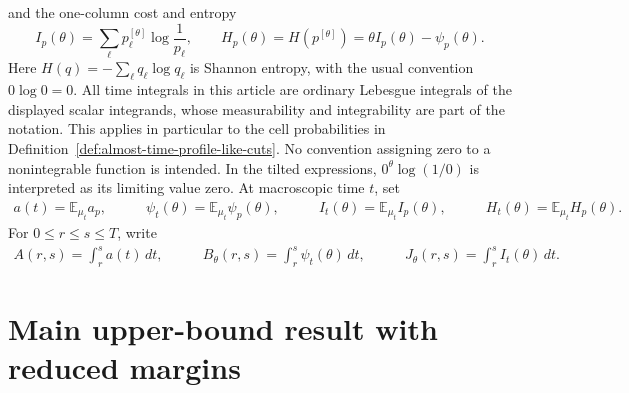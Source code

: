 \documentclass[11pt]{article}
\numberwithin{equation}{section}
\newcommand{\E}{\mathbb E}
\newcommand{\1}{\mathbf 1}
\begin{document}
and the one-column cost and entropy
\[
  I_p(\theta)=\sum_\ell p^{[\theta]}_\ell\log\frac1{p_\ell},
  \qquad
  H_p(\theta)=H(p^{[\theta]})=\theta I_p(\theta)-\psi_p(\theta).
\]
Here \(H(q)=-\sum_\ell q_\ell\log q_\ell\) is Shannon entropy, with the
usual convention \(0\log0=0\).
All time integrals in this article are ordinary Lebesgue integrals of the
displayed scalar integrands, whose measurability and integrability are part
of the notation. This applies in particular to the cell probabilities in
Definition~\ref{def:almost-time-profile-like-cuts}. No convention assigning
zero to a nonintegrable function is intended. In the tilted expressions,
$0^\theta\log(1/0)$ is interpreted as its limiting value zero.
At macroscopic time $t$, set
\begin{equation}
\label{eq:profile-costs}
\begin{aligned}
  a(t)=\E_{\mu_t}a_p,
  &\qquad
  \psi_t(\theta)=\E_{\mu_t}\psi_p(\theta),
  &\qquad
  I_t(\theta)=\E_{\mu_t}I_p(\theta),
  &\qquad
  H_t(\theta)=\E_{\mu_t}H_p(\theta).
\end{aligned}
\end{equation}
For $0\le r\le s\le T$, write
\begin{equation}
\label{eq:integrated-profile-costs}
\begin{aligned}
  A(r,s)=\int_r^s a(t)\,dt,
  &\qquad
  B_\theta(r,s)=\int_r^s\psi_t(\theta)\,dt,
  &\qquad
  J_\theta(r,s)=\int_r^s I_t(\theta)\,dt.
\end{aligned}
\end{equation}

\section{Main upper-bound result with reduced margins}
\label{sec:reduced-upper-margins}
\end{document}
